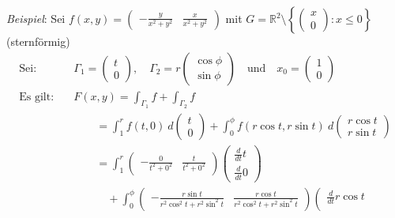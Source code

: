 \documentclass[11pt,a4paper]{book}
\newcommand {\Rzwei}	{\mathbb{R}^2}
\newcommand{\1}    	{\mathbbm{1}}
\begin{document}
\noindent
\textit{Beispiel}: Sei \(f(x,y) = \left( \begin{array}{cc}
	- \frac{y}{x^2 + y^2} &
	\frac{x}{x^2 + y^2}
\end{array} \right)\) mit \(G = \Rzwei \setminus \left\{ \left( \begin{array}{c} x \\ 0 \end{array}\right) : x \leqslant 0 \right\}\) (sternförmig)
\begin{align*}
	\textrm{Sei}: \quad & 
	\Gamma_1 = \left( \begin{array}{c} 
		t \\
		0
	\end{array} \right), \quad
	\Gamma_2 = r \left( \begin{array}{c} 
		\cos \phi \\
		\sin \phi
	\end{array} \right)
	\quad\textrm{und}\quad x_0 = \left( \begin{array}{c}
		1 \\ 0	
	\end{array} \right) \\
	\textrm{Es gilt}: \quad & 
	F(x,y) = \int_{\Gamma_1} f + \int_{\Gamma_2} f \\
	&\qquad = 
	\int_1^r f(t,0) ~d\left( \begin{array}{c}
		t \\ 0	
	\end{array} \right) +
	\int_0^\phi f(r \cos t, r \sin t	) ~d
	\left( \begin{array}{c}
		r \cos t \\
		r \sin t
	\end{array} \right) \\
	&\qquad = 
	\int_1^r \left( \begin{array}{cc}
		-\frac{0}{t^2 + 0^2} & 
		\frac{t}{t^2 + 0^2}	
	\end{array} \right) 
	\left( \begin{array}{c}
		\frac{d}{dt} t \\
		\frac{d}{dt} 0
	\end{array} \right)\\
	&\qquad\quad + 
	\int_0^\phi \left( \begin{array}{cc}
		-\frac{r \sin t}{r^2 \cos^2 t + r^2 \sin^2 t} & 
		\frac{r \cos t}{r^2 \cos^2 t + r^2 \sin^2 t}
	\end{array} \right)
	\left( \begin{array}{c}
		\frac{d}{dt} r \cos t \\

\end{array}
\end{align*}
\end{document}
